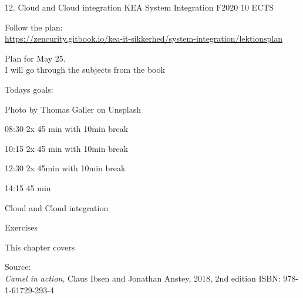 \documentclass[Screen16to9,17pt]{foils}
\begin{document}
\mytitlepage
{12. Cloud and Cloud integration}
{KEA System Integration F2020 10 ECTS}




\begin{list2}
\item Follow the plan:\\
\url{https://zencurity.gitbook.io/kea-it-sikkerhed/system-integration/lektionsplan}
\item Plan for May 25.\\
I will go through the subjects from the book
\item
\end{list2}



Todays goals:
\begin{list2}
\item
\end{list2}

Photo by Thomas Galler on Unsplash


\begin{list2}
\item 08:30 2x 45 min with 10min break\\

\item 10:15 2x 45 min with 10min break\\

\item 12:30 2x 45min with 10min break \\

\item 14:15 45 min\\

\end{list2}






\begin{list2}
\item Cloud and Cloud integration
\item
\end{list2}

Exercises
\begin{list2}
\item
\item
\end{list2}




This chapter covers
\begin{list2}
\item
\end{list2}

Source: {\footnotesize\\
\emph{Camel in action}, Claus Ibsen and Jonathan Anstey, 2018, 2nd edition
ISBN: 978-1-61729-293-4}
\end{document}
